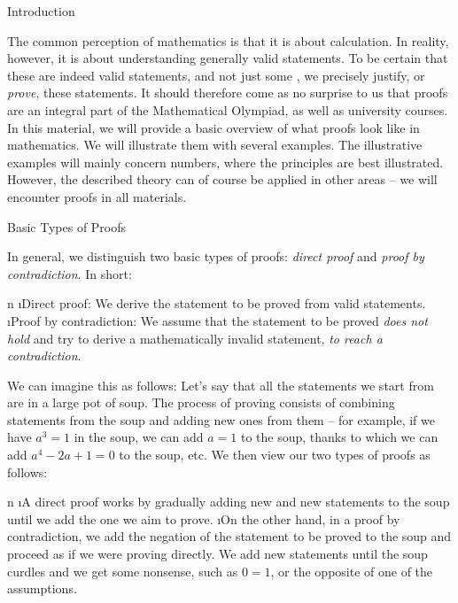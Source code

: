 





\sec Introduction

The common perception of mathematics is that it is about calculation. In reality, however, it is about understanding generally valid statements. To be certain that these are indeed valid statements, and not just some , we precisely justify, or \textit{prove}, these statements. It should therefore come as no surprise to us that proofs are an integral part of the Mathematical Olympiad, as well as university courses. In this material, we will provide a basic overview of what proofs look like in mathematics. We will illustrate them with several examples. The illustrative examples will mainly concern numbers, where the principles are best illustrated. However, the described theory can of course be applied in other areas -- we will encounter proofs in all materials.

\sec Basic Types of Proofs

In general, we distinguish two basic types of proofs: \textit{direct proof} and \textit{proof by contradiction}. In short:

\begitems \style n
\i Direct proof: We derive the statement to be proved from valid statements.
\i Proof by contradiction: We assume that the statement to be proved \textit{does not hold} and try to derive a mathematically invalid statement, \textit{to reach a contradiction}.
\enditems 

We can imagine this as follows: Let's say that all the statements we start from are in a large pot of soup. The process of proving consists of combining statements from the soup and adding new ones from them -- for example, if we have $a^3=1$ in the soup, we can add $a=1$ to the soup, thanks to which we can add $a^4-2a+1=0$ to the soup, etc. We then view our two types of proofs as follows:

\begitems \style n
\i A direct proof works by gradually adding new and new statements to the soup until we add the one we aim to prove.
\i On the other hand, in a proof by contradiction, we add the negation of the statement to be proved to the soup and proceed as if we were proving directly. We add new statements until the soup curdles and we get some nonsense, such as $0=1$, or the opposite of one of the assumptions.
\enditems

